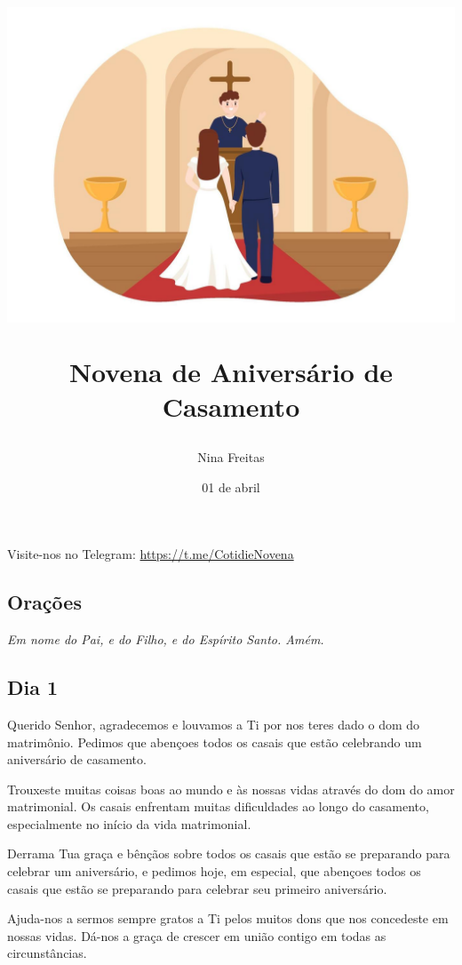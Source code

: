 \documentclass[18pt]{article}
\title{
 \includegraphics[scale=.4, trim={10cm, 0, 10cm, 0}]{./assets/imagem.jpg}
  \par
   Novena de Aniversário de Casamento}
\date{01 de abril}
\author{Nina Freitas}
\begin{document}
\maketitle

\thispagestyle{empty} %

\pagestyle{fancy}
\fancyhf{} %
\fancyfoot[LO, CE]{
}
\fancyfoot[R]{\thepage}

\centering
\vfill
Visite-nos no Telegram: \url{https://t.me/CotidieNovena}




\newpage
\begin{center}
 \section{Orações}\label{sec:Orações} %
\textit{Em nome do Pai, e do Filho, e do Espírito Santo. Amém.}
\end{center}

\justifying

\begin{center}
 \subsection*{Dia 1}
\end{center}

Querido Senhor, agradecemos e louvamos a Ti por nos teres dado o dom do matrimônio. Pedimos que abençoes todos os casais que estão celebrando um aniversário de casamento.  

Trouxeste muitas coisas boas ao mundo e às nossas vidas através do dom do amor matrimonial. Os casais enfrentam muitas dificuldades ao longo do casamento, especialmente no início da vida matrimonial.  

Derrama Tua graça e bênçãos sobre todos os casais que estão se preparando para celebrar um aniversário, e pedimos hoje, em especial, que abençoes todos os casais que estão se preparando para celebrar seu primeiro aniversário.  

Ajuda-nos a sermos sempre gratos a Ti pelos muitos dons que nos concedeste em nossas vidas. Dá-nos a graça de crescer em união contigo em todas as circunstâncias.  
\end{document}
